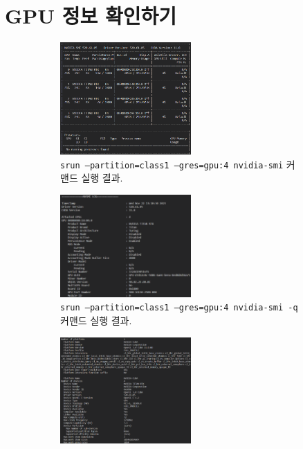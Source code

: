 \section{GPU 정보 확인하기}

\begin{enumerate}[label= (\alph*)]

    \begin{figure}[t]
        \centering
        \begin{subfigure}[b]{\textwidth}
            \centering
            \includegraphics[width=0.55\textwidth]{imgs/srun_nvidia_smi.png}
            \caption{
                \texttt{srun --partition=class1 --gres=gpu:4 nvidia-smi} 커맨드 실행 결과.
            }\label{fig:srun_nvidia_smi}
        \end{subfigure}
        \hfill
        \begin{subfigure}[b]{\textwidth}
            \centering
            \includegraphics[width=0.55\textwidth]{imgs/srun_nvidia_smi_q.png}
            \caption{
                \texttt{srun --partition=class1 --gres=gpu:4 nvidia-smi -q} 커맨드 실행 결과.
            }\label{fig:srun_nividia_smi_q}
        \end{subfigure}
        \hfill
        \begin{subfigure}[b]{\textwidth}
            \centering
            \includegraphics[width=0.55\textwidth]{imgs/srun_clinfo.png}

\end{subfigure}
\end{figure}
\end{enumerate}
